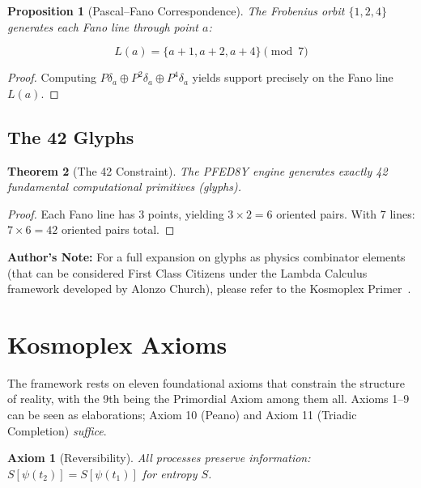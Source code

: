 \documentclass[pdflatex,sn-mathphys-num]{sn-jnl}
\theoremstyle{thmstyleone}
\newtheorem{theorem}{Theorem}
\newtheorem{proposition}[theorem]{Proposition}
\theoremstyle{thmstyletwo}
\theoremstyle{thmstylethree}
\newtheorem{axiom}{Axiom}
\begin{document}
\begin{proposition}[Pascal--Fano Correspondence]\label{prop:s1-correspondence}
The Frobenius orbit $\{1,2,4\}$ generates each Fano line through point $a$:

\begin{equation}
L(a) = \{a+1, a+2, a+4\} \pmod{7}
\end{equation}

\end{proposition}

\begin{proof}
Computing $P\delta_a \oplus P^2\delta_a \oplus P^4\delta_a$ yields support precisely on the Fano line $L(a)$.
\end{proof}

\subsection{The 42 Glyphs}\label{subsec:s1-glyphs}

\begin{theorem}[The 42 Constraint]\label{thm:s1-42constraint}
The PFED8Y engine generates exactly 42 fundamental computational primitives (glyphs).
\end{theorem}

\begin{proof}
Each Fano line has 3 points, yielding $3 \times 2 = 6$ oriented pairs. With 7 lines: $7 \times 6 = 42$ oriented pairs total.
\end{proof}

\textbf{Author's Note:} For a full expansion on glyphs as physics combinator elements (that can be considered First Class Citizens under the Lambda Calculus framework developed by Alonzo Church), please refer to the Kosmoplex Primer~\cite{macedonia2025primer}.

\section{Kosmoplex Axioms}\label{sec:s1-axioms}

The framework rests on eleven foundational axioms that constrain the structure of reality, with the 9th being the Primordial Axiom among them all. Axioms 1–9 can be seen as elaborations; Axiom 10 (Peano) and Axiom 11 (Triadic Completion) \emph{suffice}.

\begin{axiom}[Reversibility]\label{ax:reversibility}
All processes preserve information: $S[\psi(t_2)] = S[\psi(t_1)]$ for entropy $S$.
\end{axiom}
\end{document}
